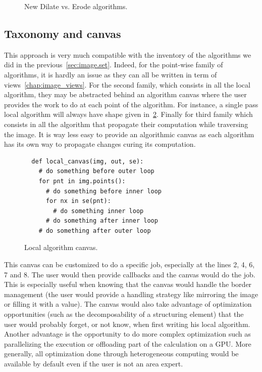 \begin{figure}[htbp]
  \centering
  \vfil
  \smallskip
  \hfil
  \caption{New Dilate vs. Erode algorithms.}
  \label{code:erode.dilate.factorized}
\end{figure}

\subsection{Taxonomy and canvas}
\label{subsec.taxonomy.canvas}

This approach is very much compatible with the inventory of the algorithms we did in the previous~\cref{sec:image.set}.
Indeed, for the point-wise family of algorithms, it is hardly an issue as they can all be written in term of
views~\cref{chap:image_views}. For the second family, which consists in all the local algorithm, they may be abstracted
behind an algorithm canvas where the user provides the work to do at each point of the algorithm. For instance, a single
pass local algorithm will always have shape given in~\ref{code:local.algorithm.canvas}. Finally for third family which
consists in all the algorithm that propagate their computation while traversing the image. It is way less easy to
provide an algorithmic canvas as each algorithm has its own way to propagate changes curing its computation.

\begin{figure}[htbp]
  \centering
  \begin{verbatim}
  def local_canvas(img, out, se):
    # do something before outer loop
    for pnt in img.points():
      # do something before inner loop
      for nx in se(pnt):
        # do something inner loop
      # do something after inner loop
    # do something after outer loop
  \end{verbatim}

  \caption{Local algorithm canvas.}
  \label{code:local.algorithm.canvas}
\end{figure}

This canvas can be customized to do a specific job, especially at the lines 2, 4, 6, 7 and 8. The user would then
provide callbacks and the canvas would do the job. This is especially useful when knowing that the canvas would handle
the border management (the user would provide a handling strategy like mirroring the image or filling it with a value).
The canvas would also take advantage of optimization opportunities (such as the decomposability of a structuring
element) that the user would probably forget, or not know, when first writing his local algorithm. Another advantage is
the opportunity to do more complex optimization such as parallelizing the execution or offloading part of the
calculation on a GPU. More generally, all optimization done through heterogeneous computing would be available by
default even if the user is not an area expert.

